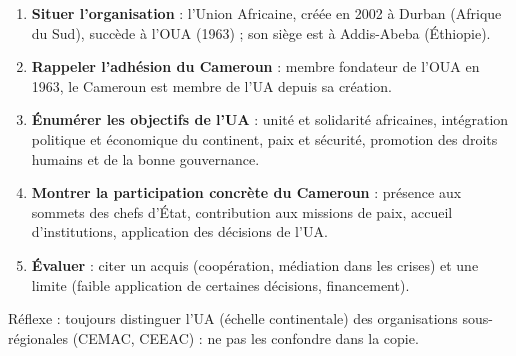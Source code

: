 \documentclass[11pt]{article}
\newcommand{\cle}[1]{{\popxbold\color{popdark}#1}}
\begin{document}
\begin{methode}
\begin{enumerate}
\item \textbf{Situer l'organisation} : l'\cle{Union Africaine}, créée en 2002 à Durban (Afrique du Sud), succède à l'OUA (1963) ; son siège est à Addis-Abeba (Éthiopie).
\item \textbf{Rappeler l'adhésion du Cameroun} : membre fondateur de l'OUA en 1963, le Cameroun est membre de l'UA depuis sa création.
\item \textbf{Énumérer les objectifs de l'UA} : unité et solidarité africaines, intégration politique et économique du continent, paix et sécurité, promotion des droits humains et de la bonne gouvernance.
\item \textbf{Montrer la participation concrète du Cameroun} : présence aux sommets des chefs d'État, contribution aux missions de paix, accueil d'institutions, application des décisions de l'UA.
\item \textbf{Évaluer} : citer un acquis (coopération, médiation dans les crises) et une limite (faible application de certaines décisions, financement).
\end{enumerate}
Réflexe : toujours distinguer l'UA (échelle continentale) des organisations sous-régionales (CEMAC, CEEAC) : ne pas les confondre dans la copie.
\end{methode}
\end{document}
